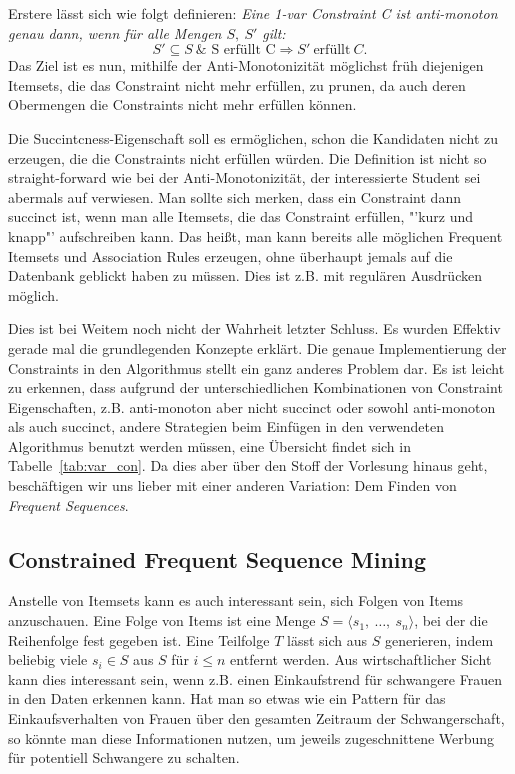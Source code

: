 Erstere lässt sich wie folgt definieren: \textit{Eine 1-var
Constraint C ist anti-monoton genau dann, wenn für alle
Mengen \(S,\ S'\) gilt:}
\[ S' \subseteq S\ \& \text{ S erfüllt C} \Longrightarrow
S'\ \text{erfüllt}\ C. \]
Das Ziel ist es nun, mithilfe der Anti-Monotonizität möglichst
früh diejenigen Itemsets, die das Constraint nicht mehr
erfüllen, zu prunen, da auch deren Obermengen die 
Constraints nicht mehr erfüllen können.

Die Succintcness-Eigenschaft soll es ermöglichen, schon die
Kandidaten nicht zu erzeugen, die die Constraints nicht 
erfüllen würden. Die Definition ist nicht so straight-forward
wie bei der Anti-Monotonizität, der interessierte Student sei
abermals auf \citet{Ng98} verwiesen. Man sollte sich merken,
dass ein Constraint dann succinct ist, wenn man alle
Itemsets, die das Constraint erfüllen, "'kurz und knapp"'
aufschreiben kann. Das heißt, man kann bereits alle möglichen
Frequent Itemsets und Association Rules erzeugen, ohne überhaupt
jemals auf die Datenbank geblickt haben zu müssen. Dies ist z.B.
mit regulären Ausdrücken möglich.

Dies ist bei Weitem noch nicht der Wahrheit letzter Schluss. Es wurden
Effektiv gerade mal die grundlegenden Konzepte erklärt. Die genaue
Implementierung der Constraints in den Algorithmus stellt ein ganz
anderes Problem dar. Es ist leicht zu erkennen, dass aufgrund der
unterschiedlichen Kombinationen von Constraint Eigenschaften, z.B.
anti-monoton aber nicht succinct oder sowohl anti-monoton als auch 
succinct, andere Strategien beim Einfügen in den verwendeten Algorithmus
benutzt werden müssen,
eine Übersicht findet sich in Tabelle~\ref{tab:var_con}. 
Da dies aber über den Stoff der Vorlesung hinaus
geht, beschäftigen wir uns lieber mit einer anderen Variation: Dem Finden
von \textit{Frequent Sequences}.

\FloatBarrier
\subsection{Constrained Frequent Sequence Mining}
Anstelle von Itemsets kann es auch interessant sein, sich Folgen von Items
anzuschauen. Eine Folge von Items ist eine Menge \(S = \langle s_1,\ \dots,\ 
s_n\rangle\), bei der die Reihenfolge fest gegeben ist. Eine Teilfolge \(T\)
lässt sich aus \(S\) generieren, indem beliebig viele \(s_i\in S\) aus \(S\)
für \(i \leq n\) entfernt werden. Aus wirtschaftlicher Sicht kann dies
interessant sein, wenn z.B. einen Einkaufstrend für schwangere Frauen in den
Daten erkennen kann. Hat man so etwas wie ein Pattern für das Einkaufsverhalten
von Frauen über den gesamten Zeitraum der Schwangerschaft, so könnte man diese
Informationen nutzen, um jeweils zugeschnittene Werbung für potentiell Schwangere
zu schalten.

